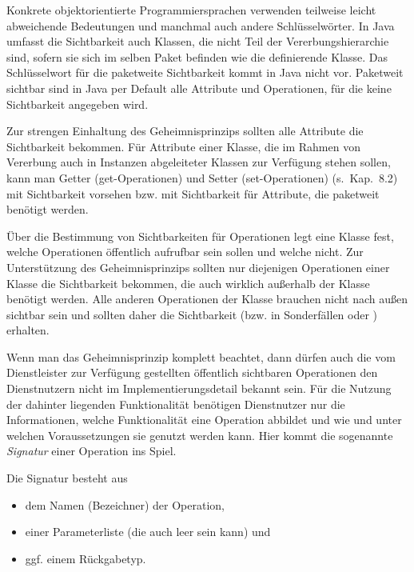 Konkrete objektorientierte Programmiersprachen verwenden teilweise leicht abweichende Bedeutungen und manchmal auch andere Schlüsselwörter. In Java umfasst die Sichtbarkeit  auch Klassen, die nicht Teil der Vererbungshierarchie sind, sofern sie sich im selben Paket befinden wie die definierende Klasse. Das Schlüssel\-wort  für die paketweite Sichtbarkeit kommt in Java nicht vor. Paketweit sichtbar sind in Java per Default alle Attribute und Operationen, für die keine Sichtbarkeit angegeben wird.

Zur strengen 
Einhaltung des Geheimnisprinzips sollten alle Attribute die Sichtbarkeit  bekommen. Für Attribute einer Klasse, die im Rahmen von Vererbung auch in Instanzen abgeleiteter Klassen zur Verfügung stehen sollen, kann man Getter (get-Operationen) und Setter (set-Operationen) (s.~Kap.~8.2) %
mit Sichtbarkeit  vorsehen bzw. mit Sichtbarkeit  für Attribute, die paketweit benötigt werden. 

Über 
die Bestimmung von Sichtbarkeiten für Operationen legt eine Klasse fest, welche Operationen öffentlich aufrufbar sein sollen und welche nicht. Zur Unterstützung des Geheimnisprinzips sollten nur diejenigen Operationen einer Klasse die Sichtbarkeit  bekommen, die auch wirklich außerhalb der Klasse benötigt werden. Alle anderen Operationen der Klasse brauchen nicht nach außen sichtbar sein und sollten daher die Sichtbarkeit  (bzw. in Sonderfällen  oder ) erhalten. 

Wenn man das Geheimnisprinzip komplett beachtet, dann dürfen auch die vom Dienstleister zur Verfügung gestellten öffentlich sichtbaren Operationen den Dienstnutzern nicht im Implementierungsdetail bekannt sein. Für die Nutzung der dahinter liegenden Funktionalität benötigen Dienstnutzer nur die Informationen, welche Funktionalität eine Operation abbildet und wie und unter welchen Voraussetzungen sie genutzt werden kann. Hier kommt die sogenannte \textit{Signatur} einer Operation ins Spiel. 

Die Signatur  besteht aus 

\begin{itemize}
	\item dem Namen (Bezeichner) der Operation,
	\item einer Parameterliste (die auch leer sein kann) und
	\item ggf. einem Rückgabetyp.
\end{itemize}

